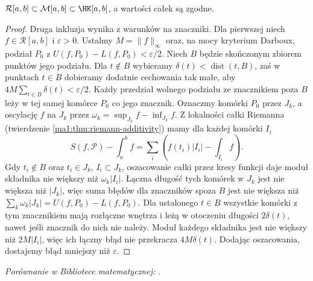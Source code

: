 \begin{stwierdzenie}
$\mathcal R[a,b]\subset\mathcal M[a,b]\subset\HK[a,b]$, a wartości całek są zgodne.
\end{stwierdzenie}
\begin{proof}
Druga inkluzja wynika z warunków na znaczniki. Dla pierwszej niech $f\in\mathcal R[a,b]$ i $\varepsilon>0$. Ustalmy $M=\|f\|_\infty$ oraz, na mocy kryterium Darboux, podział $P_0$ z $U(f,P_0)-L(f,P_0)<\varepsilon/2$. Niech $B$ będzie skończonym zbiorem punktów jego podziału. Dla $t\notin B$ wybieramy $\delta(t)<\operatorname{dist}(t,B)$, zaś w punktach $t\in B$ dobieramy dodatnie cechowania tak małe, aby $4M\sum_{t\in B}\delta(t)<\varepsilon/2$. Każdy przedział wolnego podziału ze znacznikiem poza $B$ leży w tej samej komórce $P_0$ co jego znacznik. Oznaczmy komórki $P_0$ przez $J_k$, a oscylację $f$ na $J_k$ przez $\omega_k=\sup_{J_k}f-\inf_{J_k}f$. Z lokalności całki Riemanna (twierdzenie \ref{ma1:thm:riemann-additivity}) mamy dla każdej komórki $I_i$
\[
 S(f,\mathcal P)-\int_a^b f=\sum_i\left(f(t_i)|I_i|-\int_{I_i} f\right).
\]
Gdy $t_i\notin B$ oraz $t_i\in J_k$, $I_i\subset J_k$, oszacowanie całki przez kresy funkcji daje moduł składnika nie większy niż $\omega_k|I_i|$. Łączna długość tych komórek w $J_k$ jest nie większa niż $|J_k|$, więc suma błędów dla znaczników spoza $B$ jest nie większa niż $\sum_k\omega_k|J_k|=U(f,P_0)-L(f,P_0)$. Dla ustalonego $t\in B$ wszystkie komórki z tym znacznikiem mają rozłączne wnętrza i leżą w otoczeniu długości $2\delta(t)$, nawet jeśli znacznik do nich nie należy. Moduł każdego składnika jest nie większy niż $2M|I_i|$, więc ich łączny błąd nie przekracza $4M\delta(t)$. Dodając oszacowania, dostajemy błąd mniejszy niż $\varepsilon$.
\end{proof}
\noindent\emph{Porównanie w Bibliotece matematycznej:} .

